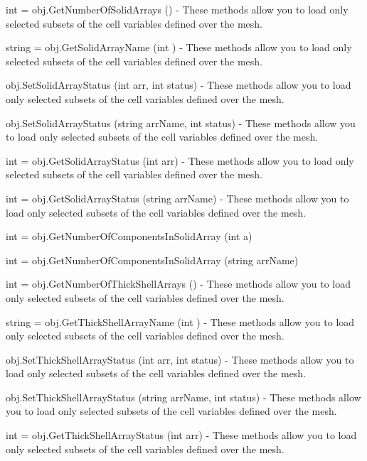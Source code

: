 \begin{DoxyItemize}
\item {\ttfamily int = obj.\-Get\-Number\-Of\-Solid\-Arrays ()} -\/ These methods allow you to load only selected subsets of the cell variables defined over the mesh.  
\item {\ttfamily string = obj.\-Get\-Solid\-Array\-Name (int )} -\/ These methods allow you to load only selected subsets of the cell variables defined over the mesh.  
\item {\ttfamily obj.\-Set\-Solid\-Array\-Status (int arr, int status)} -\/ These methods allow you to load only selected subsets of the cell variables defined over the mesh.  
\item {\ttfamily obj.\-Set\-Solid\-Array\-Status (string arr\-Name, int status)} -\/ These methods allow you to load only selected subsets of the cell variables defined over the mesh.  
\item {\ttfamily int = obj.\-Get\-Solid\-Array\-Status (int arr)} -\/ These methods allow you to load only selected subsets of the cell variables defined over the mesh.  
\item {\ttfamily int = obj.\-Get\-Solid\-Array\-Status (string arr\-Name)} -\/ These methods allow you to load only selected subsets of the cell variables defined over the mesh.  
\item {\ttfamily int = obj.\-Get\-Number\-Of\-Components\-In\-Solid\-Array (int a)}  
\item {\ttfamily int = obj.\-Get\-Number\-Of\-Components\-In\-Solid\-Array (string arr\-Name)}  
\item {\ttfamily int = obj.\-Get\-Number\-Of\-Thick\-Shell\-Arrays ()} -\/ These methods allow you to load only selected subsets of the cell variables defined over the mesh.  
\item {\ttfamily string = obj.\-Get\-Thick\-Shell\-Array\-Name (int )} -\/ These methods allow you to load only selected subsets of the cell variables defined over the mesh.  
\item {\ttfamily obj.\-Set\-Thick\-Shell\-Array\-Status (int arr, int status)} -\/ These methods allow you to load only selected subsets of the cell variables defined over the mesh.  
\item {\ttfamily obj.\-Set\-Thick\-Shell\-Array\-Status (string arr\-Name, int status)} -\/ These methods allow you to load only selected subsets of the cell variables defined over the mesh.  
\item {\ttfamily int = obj.\-Get\-Thick\-Shell\-Array\-Status (int arr)} -\/ These methods allow you to load only selected subsets of the cell variables defined over the mesh.  

\end{DoxyItemize}
